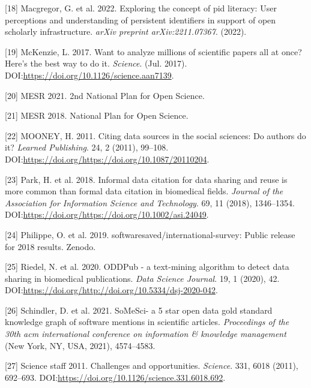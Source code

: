 \documentclass[
]{article}
\newenvironment{cslreferences}%
  {}%
  {\par}
\begin{document}
\begin{cslreferences}
\leavevmode\hypertarget{ref-macgregor2022exploring}{}%
{[}18{]} Macgregor, G. et al. 2022. Exploring the concept of pid
literacy: User perceptions and understanding of persistent identifiers
in support of open scholarly infrastructure. \emph{arXiv preprint
arXiv:2211.07367}. (2022).

\leavevmode\hypertarget{ref-McKenzie_2017}{}%
{[}19{]} McKenzie, L. 2017. Want to analyze millions of scientific
papers all at once? Here's the best way to do it. \emph{Science}. (Jul.
2017). DOI:\url{https://doi.org/10.1126/science.aan7139}.

\leavevmode\hypertarget{ref-mesri_2nd_2021}{}%
{[}20{]} MESR 2021. 2nd National Plan for Open Science.

\leavevmode\hypertarget{ref-mesri_national_2018}{}%
{[}21{]} MESR 2018. National Plan for Open Science.

\leavevmode\hypertarget{ref-10.1087ux2f20110204}{}%
{[}22{]} MOONEY, H. 2011. Citing data sources in the social sciences: Do
authors do it? \emph{Learned Publishing}. 24, 2 (2011), 99--108.
DOI:\url{https://doi.org/https://doi.org/10.1087/20110204}.

\leavevmode\hypertarget{ref-10.1002ux2fasi.24049}{}%
{[}23{]} Park, H. et al. 2018. Informal data citation for data sharing
and reuse is more common than formal data citation in biomedical fields.
\emph{Journal of the Association for Information Science and
Technology}. 69, 11 (2018), 1346--1354.
DOI:\url{https://doi.org/https://doi.org/10.1002/asi.24049}.

\leavevmode\hypertarget{ref-olivier_philippe_2019_2585783}{}%
{[}24{]} Philippe, O. et al. 2019. softwaresaved/international-survey:
Public release for 2018 results. Zenodo.

\leavevmode\hypertarget{ref-10.5334ux2fdsj-2020-042}{}%
{[}25{]} Riedel, N. et al. 2020. ODDPub - a text-mining algorithm to
detect data sharing in biomedical publications. \emph{Data Science
Journal}. 19, 1 (2020), 42.
DOI:\url{https://doi.org/http://doi.org/10.5334/dsj-2020-042}.

\leavevmode\hypertarget{ref-10.1145ux2f3459637.3482017}{}%
{[}26{]} Schindler, D. et al. 2021. SoMeSci- a 5 star open data gold
standard knowledge graph of software mentions in scientific articles.
\emph{Proceedings of the 30th acm international conference on
information \& knowledge management} (New York, NY, USA, 2021),
4574--4583.

\leavevmode\hypertarget{ref-science_2011}{}%
{[}27{]} Science staff 2011. Challenges and opportunities.
\emph{Science}. 331, 6018 (2011), 692--693.
DOI:\url{https://doi.org/10.1126/science.331.6018.692}.


\end{cslreferences}
\end{document}
